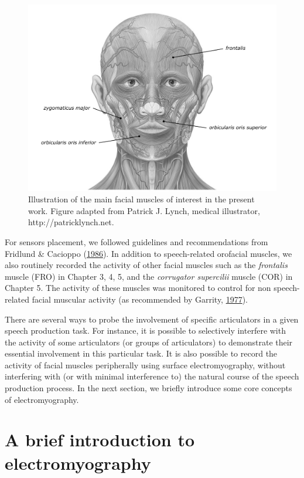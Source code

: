 \documentclass[a4paper,12pt,twoside,openright,oldfontcommands]{memoir}
\begin{document}
\begin{figure}[H]

{\centering \includegraphics[width=0.75\linewidth]{assets/facial_muscles} 

}

\caption{Illustration of the main facial muscles of interest in the present work. Figure adapted from Patrick J. Lynch, medical illustrator, http://patricklynch.net.}\label{fig:facial}
\end{figure}

For sensors placement, we followed guidelines and recommendations from Fridlund \& Cacioppo (\protect\hyperlink{ref-fridlund_guidelines_1986}{1986}). In addition to speech-related orofacial muscles, we also routinely recorded the activity of other facial muscles such as the \emph{frontalis} muscle (FRO) in Chapter 3, 4, 5, and the \emph{corrugator supercilii} muscle (COR) in Chapter 5. The activity of these muscles was monitored to control for non speech-related facial muscular activity (as recommended by Garrity, \protect\hyperlink{ref-garrity_electromyography:_1977}{1977}).

There are several ways to probe the involvement of specific articulators in a given speech production task. For instance, it is possible to selectively interfere with the activity of some articulators (or groups of articulators) to demonstrate their essential involvement in this particular task. It is also possible to record the activity of facial muscles peripherally using surface electromyography, without interfering with (or with minimal interference to) the natural course of the speech production process. In the next section, we briefly introduce some core concepts of electromyography.

\hypertarget{a-brief-introduction-to-electromyography}{%
\section{A brief introduction to electromyography}\label{a-brief-introduction-to-electromyography}}
\end{document}
